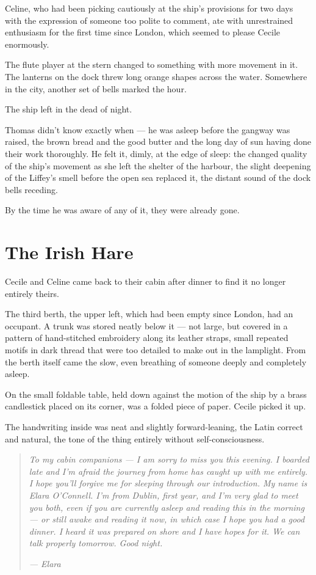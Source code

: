 Celine, who had been picking cautiously at the ship's provisions for two days with the expression of someone too polite to comment, ate with unrestrained enthusiasm for the first time since London, which seemed to please Cecile enormously.

The flute player at the stern changed to something with more movement in it. The lanterns on the dock threw long orange shapes across the water. Somewhere in the city, another set of bells marked the hour.

The ship left in the dead of night.

Thomas didn't know exactly when --- he was asleep before the gangway was raised, the brown bread and the good butter and the long day of sun having done their work thoroughly. He felt it, dimly, at the edge of sleep: the changed quality of the ship's movement as she left the shelter of the harbour, the slight deepening of the Liffey's smell before the open sea replaced it, the distant sound of the dock bells receding.

By the time he was aware of any of it, they were already gone.

\section*{The Irish Hare}

Cecile and Celine came back to their cabin after dinner to find it no longer entirely theirs.

The third berth, the upper left, which had been empty since London, had an occupant. A trunk was stored neatly below it --- not large, but covered in a pattern of hand-stitched embroidery along its leather straps, small repeated motifs in dark thread that were too detailed to make out in the lamplight. From the berth itself came the slow, even breathing of someone deeply and completely asleep.

On the small foldable table, held down against the motion of the ship by a brass candlestick placed on its corner, was a folded piece of paper. Cecile picked it up.

The handwriting inside was neat and slightly forward-leaning, the Latin correct and natural, the tone of the thing entirely without self-consciousness.

\begin{quote}
\textit{To my cabin companions --- I am sorry to miss you this evening. I boarded late and I'm afraid the journey from home has caught up with me entirely. I hope you'll forgive me for sleeping through our introduction. My name is Elara O'Connell. I'm from Dublin, first year, and I'm very glad to meet you both, even if you are currently asleep and reading this in the morning --- or still awake and reading it now, in which case I hope you had a good dinner. I heard it was prepared on shore and I have hopes for it. We can talk properly tomorrow. Good night.}

\textit{--- Elara}
\end{quote}

